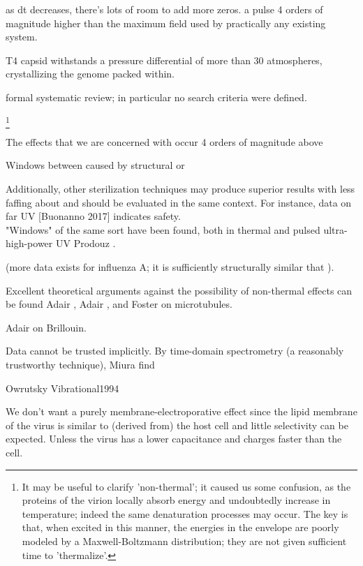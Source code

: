 \documentclass[paper.tex]{subfiles}
\begin{document}
\begin{multicols}{1}
as dt decreases, there's lots of room to add more zeros. a pulse 4 orders of magnitude higher than the maximum field used by practically any existing system.





T4 capsid withstands a pressure differential of more than 30 atmospheres, crystallizing the genome packed within. \cite{Osmotic2003}


formal systematic review; in particular no search criteria were defined.

%
\footnote{It may be useful to clarify 'non-thermal'; it caused us some confusion, as the proteins of the virion locally absorb energy and undoubtedly increase in temperature; indeed the same denaturation processes may occur. The key is that, when excited in this manner, the energies in the envelope are poorly modeled by a Maxwell-Boltzmann distribution; they are not given sufficient time to 'thermalize'.} 
%


The effects that we are concerned with occur 4 orders of magnitude above 

Windows between caused by structural or 

Additionally, other sterilization techniques may produce superior results with less faffing about and should be evaluated in the same context. For instance, data on far UV [Buonanno 2017] indicates safety.\\

"Windows" of the same sort have been found, both in thermal and pulsed ultra-high-power UV Prodouz \cite{Use1987a}.


(more data exists for influenza A; it is sufficiently structurally similar that ).



Excellent theoretical arguments against the possibility of non-thermal effects can be found Adair \cite{Vibrational2002}, Adair \cite{Biological2002}, and Foster \cite{Viscous2000} on microtubules. 



Adair \cite{Biophysics2000} on Brillouin.


Data cannot be trusted implicitly. By time-domain spectrometry (a reasonably trustworthy technique), Miura \cite{Microwave1994} find 


Owrutsky Vibrational1994




We don't want a purely membrane-electroporative effect since the lipid membrane of the virus is similar to (derived from) the host cell and little selectivity can be expected. Unless the virus has a lower capacitance and charges faster than the cell.


\end{multicols}
\end{document}
